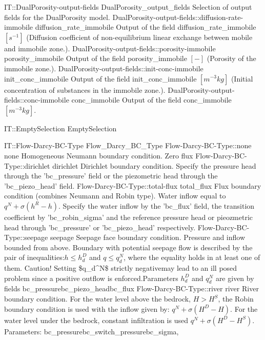 \begin{SelectionType}
	{IT::DualPorosity-output-fields}
	{DualPorosity{\_}output{\_}fields}
	{{{Selection of output fields for the DualPorosity model.}}}
		\SelectionItem
			{DualPorosity-output-fields::diffusion-rate-immobile}
			{diffusion{\_}rate{\_}immobile}
			{{{Output of the field diffusion{\_}rate{\_}immobile }{$[s^{-1}]$}{ (Diffusion coefficient of non-equilibrium linear exchange between mobile and immobile zone.).}}}
		\SelectionItem
			{DualPorosity-output-fields::porosity-immobile}
			{porosity{\_}immobile}
			{{{Output of the field porosity{\_}immobile }{$[-]$}{ (Porosity of the immobile zone.).}}}
		\SelectionItem
			{DualPorosity-output-fields::init-conc-immobile}
			{init{\_}conc{\_}immobile}
			{{{Output of the field init{\_}conc{\_}immobile }{$[m^{-3}kg]$}{ (Initial concentration of substances in the immobile zone.).}}}
		\SelectionItem
			{DualPorosity-output-fields::conc-immobile}
			{conc{\_}immobile}
			{{{Output of the field conc{\_}immobile }{$[m^{-3}kg]$}{.}}}
\end{SelectionType}
\begin{SelectionType}
	{IT::EmptySelection}
	{EmptySelection}
	{}
\end{SelectionType}
\begin{SelectionType}
	{IT::Flow-Darcy-BC-Type}
	{Flow{\_}Darcy{\_}BC{\_}Type}
	{}
		\SelectionItem
			{Flow-Darcy-BC-Type::none}
			{none}
			{{{Homogeneous Neumann boundary condition. Zero flux}}}
		\SelectionItem
			{Flow-Darcy-BC-Type::dirichlet}
			{dirichlet}
			{{{Dirichlet boundary condition. Specify the pressure head through the 'bc{\_}pressure' field or the piezometric head through the 'bc{\_}piezo{\_}head' field.}}}
		\SelectionItem
			{Flow-Darcy-BC-Type::total-flux}
			{total{\_}flux}
			{{{Flux boundary condition (combines Neumann and Robin type). Water inflow equal to }{$q^N + \sigma (h^R - h)$}{. Specify the water inflow by the 'bc{\_}flux' field, the transition coefficient by 'bc{\_}robin{\_}sigma' and the reference pressure head or pieozmetric head through 'bc{\_}pressure' or 'bc{\_}piezo{\_}head' respectively.}}}
		\SelectionItem
			{Flow-Darcy-BC-Type::seepage}
			{seepage}
			{{{Seepage face boundary condition. Pressure and inflow bounded from above. Boundary with potential seepage flow is described by the pair of inequalities:}{$h \le h_d^D$}{ and }{$ q \le q_d^N$}{, where the equality holds in at least one of them. Caution! Setting {\$}q{\_}d{\^{}}N{\$} strictly negativemay lead to an ill posed problem since a positive outflow is enforced.Parameters }{$h_d^D$}{ and }{$q_d^N$}{ are given by fields }\ttfamily bc{\_}pressure\ttfamily bc{\_}piezo{\_}head\ttfamily bc{\_}flux}}
		\SelectionItem
			{Flow-Darcy-BC-Type::river}
			{river}
			{{{River boundary condition. For the water level above the bedrock, }{$H > H^S$}{, the Robin boundary condition is used with the inflow given by: }{ $q^N + \sigma(H^D - H)$}{. For the water level under the bedrock, constant infiltration is used }{ $q^N + \sigma(H^D - H^S)$}{. Parameters: }\ttfamily bc{\_}pressure\ttfamily bc{\_}switch{\_}pressure\ttfamily bc{\_}sigma,}}
\end{SelectionType}
